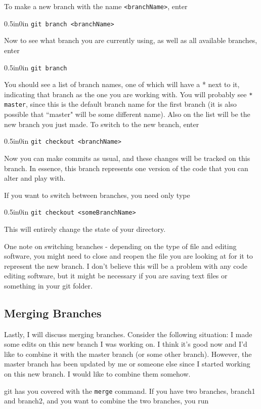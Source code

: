 \documentclass[11pt]{article}
\newcommand{\code}[1]{\begin{adjustwidth}{0.5in}{0in}
    \texttt{#1}
    \end{adjustwidth}}
\begin{document}
To make a new branch with the name \texttt{<branchName>}, enter

\code{git branch <branchName>}

Now to see what branch you are currently using, as well as all available branches, enter

\code{git branch}

You should see a list of branch names, one of which will have a * next to it, indicating that branch as the one you are working with.  You will probably see \texttt{* master}, since this is the default branch name for the first branch (it is also possible that ``master" will be some different name).  Also on the list will be the new branch you just made.  To switch to the new branch, enter

\code{git checkout <branchName>}

Now you can make commits as usual, and these changes will be tracked on this branch.  In essence, this branch represents one version of the code that you can alter and play with. 

If you want to switch between branches, you need only type

\code{git checkout <someBranchName>}

This will entirely change the state of your directory.  

One note on switching branches - depending on the type of file and editing software, you might need to close and reopen the file you are looking at for it to represent the new branch.  I don't believe this will be a problem with any code editing software, but it might be necessary if you are saving text files or something in your git folder.

\subsection{Merging Branches}
\label{sec:Merging}

Lastly, I will discuss merging branches.  Consider the following situation:  I made some edits on this new branch I was working on.  I think it's good now and I'd like to combine it with the master branch (or some other branch).  However, the master branch has been updated by me or someone else since I started working on this new branch.  I would like to combine them somehow.

git has you covered with the \texttt{merge} command.  If you have two branches, branch1 and branch2, and you want to combine the two branches, you run
\end{document}
